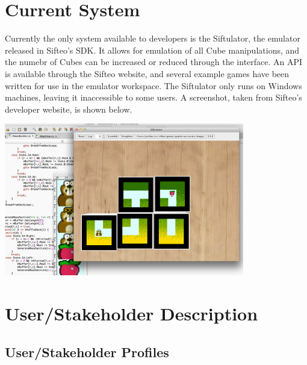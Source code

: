 \documentclass[12pt]{article}
\begin{document}
\section{Current System}
Currently the only system available to developers is the Siftulator, the emulator released in Sifteo's SDK.  It allows for emulation of all Cube manipulations, and the numebr of Cubes can be increased or reduced through the interface.  An API is available through the Sifteo website, and several example games have been written for use in the emulator workspace.  The Siftulator only runs on Windows machines, leaving it inaccessible to some users.  A screenshot, taken from Sifteo's developer website, is shown below.
\begin{center}
        \includegraphics{siftulator.png}
\end{center}

\section{User/Stakeholder Description}

               \subsection{User/Stakeholder Profiles}
\end{document}
